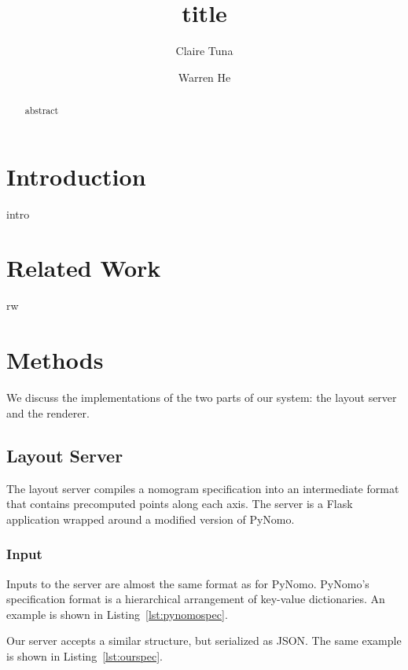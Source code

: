 \documentclass{proc}
\title{title}
\author{Claire Tuna \and Warren He}
\begin{document}
\maketitle

\begin{abstract}
abstract
\end{abstract}

\section{Introduction}
intro

\section{Related Work}
rw\cite{pynomo}

\section{Methods}
We discuss the implementations of the two parts of our system: the
layout server and the renderer.

\subsection{Layout Server}
The layout server compiles a nomogram specification into an
intermediate format that contains precomputed points along each axis.
The server is a Flask~\cite{flask} application wrapped around a
modified version of PyNomo.

\subsubsection{Input}
Inputs to the server are almost the same format as for PyNomo.
PyNomo's specification format is a hierarchical arrangement of
key-value dictionaries.
An example is shown in Listing~\ref{lst:pynomospec}.

Our server accepts a similar structure, but serialized as JSON.
The same example is shown in Listing~\ref{lst:ourspec}.

\end{document}
